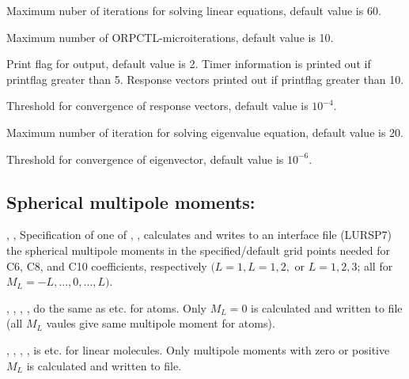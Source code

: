 \begin{description}
\item{}
Maximum nuber of iterations for solving linear equations, default value is 60.

\item{}
Maximum number of ORPCTL-microiterations, default value is 10.

\item{}
Print flag for output, default value is 2. Timer information is printed
out if printflag greater than 5. Response vectors printed out if
printflag greater than 10.

\item{}
Threshold for convergence of response vectors, default value is $10^{-4}$.

\item{}
Maximum number of iteration for solving eigenvalue equation, default
value is 20.

\item{}
Threshold for convergence of eigenvector, default value is $10^{-6}$.

\end{description}


\subsection{Spherical multipole moments: }

\begin{description}

\item{, , }
Specification of one of , , 
calculates and writes to an interface file (LURSP7) the spherical multipole
moments in the specified/default grid points needed for C6, C8, and C10
coefficients, respectively $(L=1, L=1,2,$ or $L=1,2,3$; all for $M_L =
-L,...,0,...,L)$.

\item{, , }
, ,  do the same as  etc. for
atoms. Only $M_L=0$ is
calculated and written to file (all $M_L$ vaules give same multipole moment 
for 
atoms).

\item{, , }
, ,  is  etc. for linear
molecules. Only
multipole moments with zero or positive $M_L$
is calculated and written to 
file.

\end{description}

